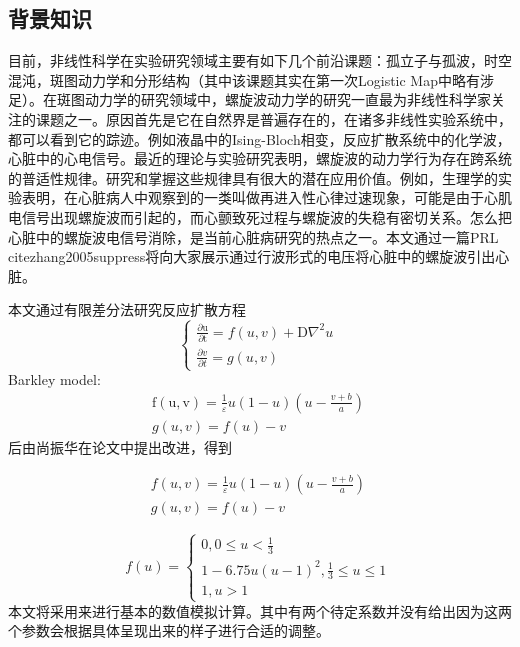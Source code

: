 

\subsection{背景知识}
目前，非线性科学在实验研究领域主要有如下几个前沿课题：孤立子与孤波，时空混沌，斑图动力学和分形结构（其中该课题其实在第一次Logistic Map中略有涉足）。在斑图动力学的研究领域中，螺旋波动力学的研究一直最为非线性科学家关注的课题之一。原因首先是它在自然界是普遍存在的，在诸多非线性实验系统中，都可以看到它的踪迹。例如液晶中的Ising-Bloch相变，反应扩散系统中的化学波，心脏中的心电信号。最近的理论与实验研究表明，螺旋波的动力学行为存在跨系统的普适性规律。研究和掌握这些规律具有很大的潜在应用价值。例如，生理学的实验表明，在心脏病人中观察到的一类叫做再进入性心律过速现象，可能是由于心肌电信号出现螺旋波而引起的，而心颤致死过程与螺旋波的失稳有密切关系。怎么把心脏中的螺旋波电信号消除，是当前心脏病研究的热点之一。本文通过一篇PRL cite{zhang2005suppress}将向大家展示通过行波形式的电压将心脏中的螺旋波引出心脏。

本文通过有限差分法研究反应扩散方程
\begin{equation}
\left\{\begin{array}{c}
\frac{\partial \mathrm{u}}{\partial \mathrm{t}}=f(u, v)+\mathrm{D} \nabla^{2} u \\
\frac{\partial v}{\partial t}=g(u, v)
\end{array}\right.~
\end{equation}
Barkley model:
\begin{equation}
\begin{array}{c}
\mathrm{f}(\mathrm{u}, \mathrm{v})=\frac{1}{\varepsilon} u(1-u)\left(u-\frac{v+b}{a}\right) \\
g(u, v)=f(u)-v
\end{array}~
\end{equation}
后由尚振华在论文中提出改进，得到

\begin{equation}
\begin{array}{c}
	f(u, v)=\frac{1}{\varepsilon} u(1-u)\left(u-\frac{v+b}{a}\right)\\
	g(u, v)=f(u)-v
\end{array}~
\end{equation}

\begin{equation}
f(u)=\left\{\begin{array}{c}
0,0 \leq u<\frac{1}{3} \\
1-6.75 u(u-1)^{2}, \frac{1}{3} \leq u \leq 1 \\
1, u>1
\end{array}\right.~
\end{equation}
本文将采用来进行基本的数值模拟计算。其中有两个待定系数并没有给出因为这两个参数会根据具体呈现出来的样子进行合适的调整。
